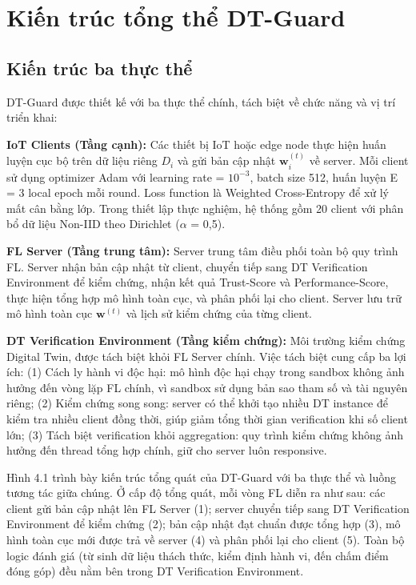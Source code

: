 \section{Kiến trúc tổng thể DT-Guard}

\subsection{Kiến trúc ba thực thể}
DT-Guard được thiết kế với ba thực thể chính, tách biệt về chức năng và vị trí triển khai:

\textbf{IoT Clients (Tầng cạnh):} Các thiết bị IoT hoặc edge node thực hiện huấn luyện cục bộ trên dữ liệu riêng $D_{i}$ và gửi bản cập nhật $\mathbf{w}_{i}^{(t)}$ về server. Mỗi client sử dụng optimizer Adam với learning rate = $10^{-3}$, batch size 512, huấn luyện E = 3 local epoch mỗi round. Loss function là Weighted Cross-Entropy để xử lý mất cân bằng lớp. Trong thiết lập thực nghiệm, hệ thống gồm 20 client với phân bổ dữ liệu Non-IID theo Dirichlet ($\alpha$ = 0,5).

\textbf{FL Server (Tầng trung tâm):} Server trung tâm điều phối toàn bộ quy trình FL. Server nhận bản cập nhật từ client, chuyển tiếp sang DT Verification Environment để kiểm chứng, nhận kết quả Trust-Score và Performance-Score, thực hiện tổng hợp mô hình toàn cục, và phân phối lại cho client. Server lưu trữ mô hình toàn cục $\mathbf{w}^{(t)}$ và lịch sử kiểm chứng của từng client.

\textbf{DT Verification Environment (Tầng kiểm chứng):} Môi trường kiểm chứng Digital Twin, được tách biệt khỏi FL Server chính. Việc tách biệt cung cấp ba lợi ích: (1) Cách ly hành vi độc hại: mô hình độc hại chạy trong sandbox không ảnh hưởng đến vòng lặp FL chính, vì sandbox sử dụng bản sao tham số và tài nguyên riêng; (2) Kiểm chứng song song: server có thể khởi tạo nhiều DT instance để kiểm tra nhiều client đồng thời, giúp giảm tổng thời gian verification khi số client lớn; (3) Tách biệt verification khỏi aggregation: quy trình kiểm chứng không ảnh hưởng đến thread tổng hợp chính, giữ cho server luôn responsive.

Hình 4.1 trình bày kiến trúc tổng quát của DT-Guard với ba thực thể và luồng tương tác giữa chúng. Ở cấp độ tổng quát, mỗi vòng FL diễn ra như sau: các client gửi bản cập nhật lên FL Server (1); server chuyển tiếp sang DT Verification Environment để kiểm chứng (2); bản cập nhật đạt chuẩn được tổng hợp (3), mô hình toàn cục mới được trả về server (4) và phân phối lại cho client (5). Toàn bộ logic đánh giá (từ sinh dữ liệu thách thức, kiểm định hành vi, đến chấm điểm đóng góp) đều nằm bên trong DT Verification Environment.

